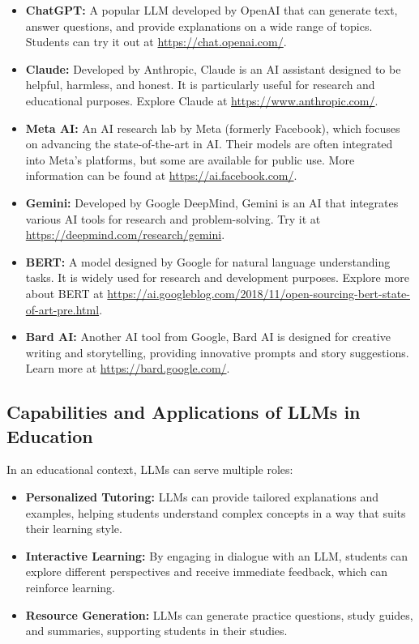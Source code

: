 \documentclass{article}
\begin{document}
\begin{itemize}
    \item \textbf{ChatGPT:} A popular LLM developed by OpenAI that can generate text, answer questions, and provide explanations on a wide range of topics. Students can try it out at \href{https://chat.openai.com/}{https://chat.openai.com/}.
    \item \textbf{Claude:} Developed by Anthropic, Claude is an AI assistant designed to be helpful, harmless, and honest. It is particularly useful for research and educational purposes. Explore Claude at \href{https://www.anthropic.com/}{https://www.anthropic.com/}.
    \item \textbf{Meta AI:} An AI research lab by Meta (formerly Facebook), which focuses on advancing the state-of-the-art in AI. Their models are often integrated into Meta’s platforms, but some are available for public use. More information can be found at \href{https://ai.facebook.com/}{https://ai.facebook.com/}.
    \item \textbf{Gemini:} Developed by Google DeepMind, Gemini is an AI that integrates various AI tools for research and problem-solving. Try it at \href{https://deepmind.com/research/gemini}{https://deepmind.com/research/gemini}.
    \item \textbf{BERT:} A model designed by Google for natural language understanding tasks. It is widely used for research and development purposes. Explore more about BERT at \href{https://ai.googleblog.com/2018/11/open-sourcing-bert-state-of-art-pre.html}{https://ai.googleblog.com/2018/11/open-sourcing-bert-state-of-art-pre.html}.
    \item \textbf{Bard AI:} Another AI tool from Google, Bard AI is designed for creative writing and storytelling, providing innovative prompts and story suggestions. Learn more at \href{https://bard.google.com/}{https://bard.google.com/}.
\end{itemize}

\subsection{Capabilities and Applications of LLMs in Education}

In an educational context, LLMs can serve multiple roles:
\begin{itemize}
    \item \textbf{Personalized Tutoring:} LLMs can provide tailored explanations and examples, helping students understand complex concepts in a way that suits their learning style.
    \item \textbf{Interactive Learning:} By engaging in dialogue with an LLM, students can explore different perspectives and receive immediate feedback, which can reinforce learning.
    \item \textbf{Resource Generation:} LLMs can generate practice questions, study guides, and summaries, supporting students in their studies.
\end{itemize}
\end{document}
